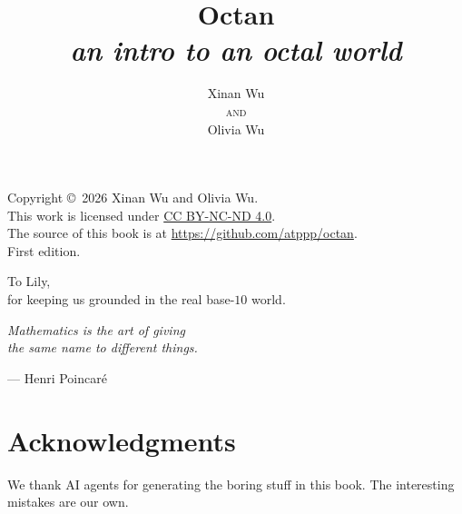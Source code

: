 \documentclass[11pt,oneside]{book}
\title{Octan\\[0.55em]\large\normalfont\textit{an intro to an octal world}}
\author{Xinan Wu\\[0.7em]
  {\small\scshape and}\\[0.7em]
  Olivia Wu}
\date{}
\begin{document}
\frontmatter
\maketitle
\setcounter{page}{2}
\setcounter{tocdepth}{0}
\onehalfspacing
\hypersetup{pageanchor=true}

\thispagestyle{empty}
\vspace*{\fill}
\noindent
Copyright \copyright\ 2026 Xinan Wu and Olivia Wu.\\[0.6em]
This work is licensed under \href{https://creativecommons.org/licenses/by-nc-nd/4.0/}{CC BY-NC-ND 4.0}.\\[0.6em]
The source of this book is at \url{https://github.com/atppp/octan}.\\[0.6em]
First edition.
\vspace*{1.5cm}
\clearpage

\thispagestyle{empty}
\vspace*{0.28\textheight}
\begin{center}
\large
To Lily,\\[0.55em]
\normalsize
for keeping us grounded in the real base-$10$ world.
\end{center}

\clearpage
\thispagestyle{empty}
\vspace*{0.28\textheight}
\begin{center}
\large\itshape
Mathematics is the art of giving\\
the same name to different things.
\end{center}
\vspace{1.2em}
\begin{center}
--- Henri Poincaré
\end{center}
\clearpage



\chapter{Acknowledgments}
\label{ch:ack}

We thank AI agents for generating the boring stuff in this book. The interesting mistakes are our own.

\tableofcontents

\mainmatter











\end{document}
